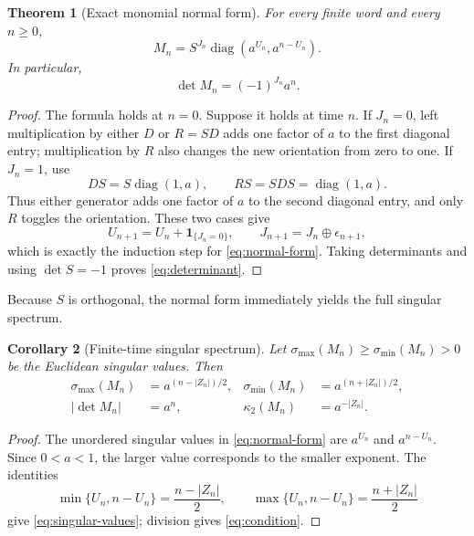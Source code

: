 \documentclass[11pt,a4paper]{amsart}
\newtheorem{theorem}{Theorem}[section]
\newtheorem{corollary}[theorem]{Corollary}
\theoremstyle{definition}
\theoremstyle{remark}
\newcommand{\diag}{\operatorname{diag}}
\newcommand{\one}{\mathbf 1}
\begin{document}
\begin{theorem}[Exact monomial normal form]\label{thm:normal}
For every finite word and every $n\geq0$,
\begin{equation}\label{eq:normal-form}
 \boxed{\quad
 M_n=S^{J_n}\diag\!\left(a^{U_n},a^{n-U_n}\right).
 \quad}
\end{equation}
In particular,
\begin{equation}\label{eq:determinant}
 \det M_n=(-1)^{J_n}a^n.
\end{equation}
\end{theorem}

\begin{proof}
The formula holds at $n=0$.  Suppose it holds at time $n$.  If $J_n=0$,
left multiplication by either $D$ or $R=SD$ adds one factor of $a$ to
the first diagonal entry; multiplication by $R$ also changes the new
orientation from zero to one.  If $J_n=1$, use
\begin{equation}\label{eq:swap-identities}
 DS=S\diag(1,a),\qquad RS=SDS=\diag(1,a).
\end{equation}
Thus either generator adds one factor of $a$ to the second diagonal entry,
and only $R$ toggles the orientation.  These two cases give
\[
 U_{n+1}=U_n+\one_{\{J_n=0\}},\qquad
 J_{n+1}=J_n\mathbin{\oplus}\epsilon_{n+1},
\]
which is exactly the induction step for \eqref{eq:normal-form}.
Taking determinants and using $\det S=-1$ proves
\eqref{eq:determinant}.
\end{proof}

Because $S$ is orthogonal, the normal form immediately yields the full
singular spectrum.

\begin{corollary}[Finite-time singular spectrum]\label{cor:singular}
Let $\sigma_{\max}(M_n)\geq\sigma_{\min}(M_n)>0$ be the Euclidean
singular values.  Then
\begin{align}
 \sigma_{\max}(M_n)&=a^{(n-|Z_n|)/2},
 &\sigma_{\min}(M_n)&=a^{(n+|Z_n|)/2},\label{eq:singular-values}\\
 |\det M_n|&=a^n,
 &\kappa_2(M_n)&=a^{-|Z_n|}.\label{eq:condition}
\end{align}
\end{corollary}

\begin{proof}
The unordered singular values in \eqref{eq:normal-form} are
$a^{U_n}$ and $a^{n-U_n}$.  Since $0<a<1$, the larger value corresponds
to the smaller exponent.  The identities
\[
 \min\{U_n,n-U_n\}=\frac{n-|Z_n|}{2},\qquad
 \max\{U_n,n-U_n\}=\frac{n+|Z_n|}{2}
\]
give \eqref{eq:singular-values}; division gives
\eqref{eq:condition}.
\end{proof}
\end{document}
